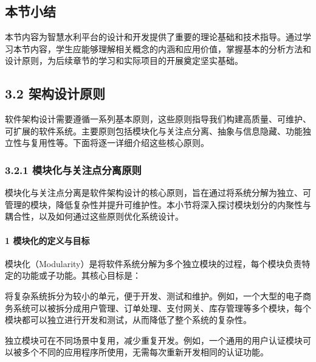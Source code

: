 \hypertarget{ux672cux8282ux5c0fux7ed3}{%
\subsection{本节小结}\label{ux672cux8282ux5c0fux7ed3}}

本节内容为智慧水利平台的设计和开发提供了重要的理论基础和技术指导。通过学习本节内容，学生应能够理解相关概念的内涵和应用价值，掌握基本的分析方法和设计原则，为后续章节的学习和实际项目的开展奠定坚实基础。

\hypertarget{ux67b6ux6784ux8bbeux8ba1ux539fux5219}{%
\subsection{3.2 架构设计原则}\label{ux67b6ux6784ux8bbeux8ba1ux539fux5219}}

软件架构设计需要遵循一系列基本原则，这些原则指导我们构建高质量、可维护、可扩展的软件系统。主要原则包括模块化与关注点分离、抽象与信息隐藏、功能独立性与复用性等。下面将逐一详细介绍这些核心原则。

\hypertarget{ux6a21ux5757ux5316ux4e0eux5173ux6ce8ux70b9ux5206ux79bbux539fux5219}{%
\subsubsection{3.2.1 模块化与关注点分离原则}\label{ux6a21ux5757ux5316ux4e0eux5173ux6ce8ux70b9ux5206ux79bbux539fux5219}}

模块化与关注点分离是软件架构设计的核心原则，旨在通过将系统分解为独立、可管理的模块，降低复杂性并提升可维护性。本小节将深入探讨模块划分的内聚性与耦合性，以及如何通过这些原则优化系统设计。

\hypertarget{ux6a21ux5757ux5316ux7684ux5b9aux4e49ux4e0eux76eeux6807}{%
\paragraph{1 模块化的定义与目标}\label{ux6a21ux5757ux5316ux7684ux5b9aux4e49ux4e0eux76eeux6807}}

模块化（Modularity）是将软件系统分解为多个独立模块的过程，每个模块负责特定的功能或子功能。其核心目标是：

将复杂系统拆分为较小的单元，便于开发、测试和维护。例如，一个大型的电子商务系统可以被拆分成用户管理、订单处理、支付网关、库存管理等多个模块，每个模块都可以独立进行开发和测试，从而降低了整个系统的复杂性。

独立模块可在不同场景中复用，减少重复开发。例如，一个通用的用户认证模块可以被多个不同的应用程序所使用，无需每次重新开发相同的认证功能。

